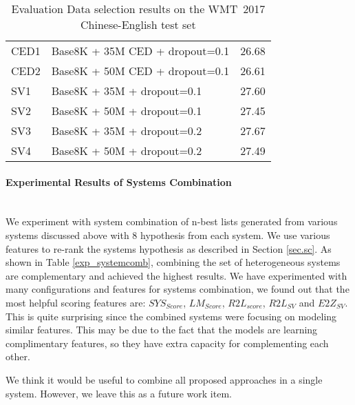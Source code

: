 \documentclass[a4paper]{article}
\begin{document}
\begin{CJK*}{UTF8}{gbsn}
\begin{table}[ht]
\begin{tabular}{@{}llr@{}}
\midrule
CED1 & Base8K + 35M CED + dropout=0.1   &  26.68 \\
CED2 & Base8K + 50M CED + dropout=0.1   & 26.61  \\
\midrule 
SV1 & Base8K + 35M + dropout=0.1 &  27.60\\
SV2 & Base8K + 50M + dropout=0.1 & 27.45\\
SV3 & Base8K + 35M + dropout=0.2 & 27.67\\
SV4 & Base8K + 50M + dropout=0.2 & 27.49\\
\bottomrule

\end{tabular}
\caption{Evaluation Data selection results on the WMT~2017 Chinese-English test set}
\label{exp_dataselect}
\end{table}


\paragraph{Experimental Results of Systems Combination}\mbox{}\\

We experiment with system combination of n-best lists generated from various systems discussed above with  8 hypothesis from each system. We use various features to re-rank the systems hypothesis as described in Section \ref{sec.sc}. 
As shown in Table \ref{exp_systemcomb}, combining the set of  heterogeneous systems are complementary and achieved the highest results. We have experimented with many configurations and features for systems combination, we found out that the most helpful scoring features are: $SYS_{Score}$, $LM_{Score}$, $R2L_{score}$,  $R2L_{SV}$  and $E2Z_{SV}$. This is  quite surprising  since the combined systems were focusing on modeling similar features. This may be due to the fact that the models are learning complimentary features, so they have extra capacity for complementing each other.

We think it would be useful to combine all proposed approaches in a single system. However, we leave this as a future work item.





\end{CJK*}
\end{document}
